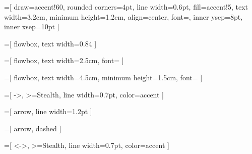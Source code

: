 



=[
  draw=accent!60,
  rounded corners=4pt,
  line width=0.6pt,
  fill=accent!5,
  text width=3.2cm,           %
  minimum height=1.2cm,       %
  align=center,
  font=\small,                %
  inner ysep=8pt,             %
  inner xsep=10pt             %
]

=[
  flowbox,
  text width=0.84\linewidth
]

=[
  flowbox,
  text width=2.5cm,
  font=\footnotesize          %
]

=[
  flowbox,
  text width=4.5cm,
  minimum height=1.5cm,
  font=\normalsize            %
]


=[
  ->,
  >=Stealth,                  %
  line width=0.7pt,           %
  color=accent
]

=[
  arrow,
  line width=1.2pt
]

=[
  arrow,
  dashed
]

=[
  <->,
  >=Stealth,
  line width=0.7pt,
  color=accent
]

